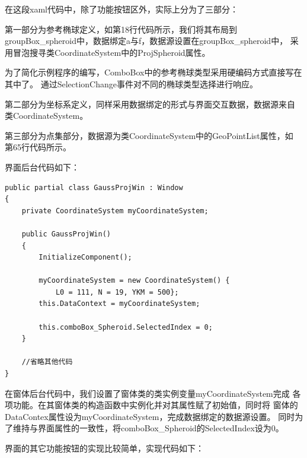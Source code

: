 在这段xaml代码中，除了功能按钮区外，实际上分为了三部分：

第一部分为参考椭球定义，如第18行代码所示，我们将其布局到
groupBox\_spheroid中，数据绑定a与f，数据源设置在groupBox\_spheroid中，
采用冒泡搜寻类CoordinateSystem中的ProjSpheroid属性。

为了简化示例程序的编写，ComboBox中的参考椭球类型采用硬编码方式直接写在其中了。
通过SelectionChange事件对不同的椭球类型选择进行响应。

第二部分为坐标系定义，同样采用数据绑定的形式与界面交互数据，数据源来自
类CoordinateSystem。

第三部分为点集部分，数据源为类CoordinateSystem中的GeoPointList属性，如
第65行代码所示。

界面后台代码如下：

\begin{lstlisting}
public partial class GaussProjWin : Window
{       
    private CoordinateSystem myCoordinateSystem;

    public GaussProjWin()
    {
        InitializeComponent();

        myCoordinateSystem = new CoordinateSystem() {
            L0 = 111, N = 19, YKM = 500};
        this.DataContext = myCoordinateSystem;

        this.comboBox_Spheroid.SelectedIndex = 0;
    }

    //省略其他代码
}
\end{lstlisting}

在窗体后台代码中，我们设置了窗体类的类实例变量myCoordinateSystem完成
各项功能。在其窗体类的构造函数中实例化并对其属性赋了初始值，同时将
窗体的DataContex属性设为myCoordinateSystem，完成数据绑定的数据源设置。
同时为了维持与界面属性的一致性，将comboBox\_Spheroid的SelectedIndex设为0。

界面的其它功能按钮的实现比较简单，实现代码如下：


